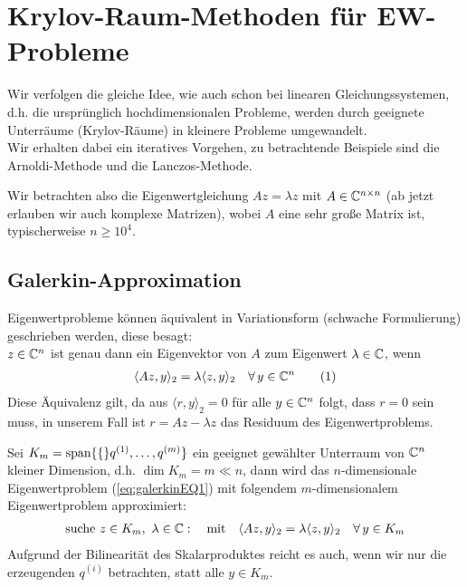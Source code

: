 
\section{Krylov-Raum-Methoden für EW-Probleme}
Wir verfolgen die gleiche Idee, wie auch schon bei linearen Gleichungssystemen, d.h. die ursprünglich hochdimensionalen
Probleme, werden durch geeignete Unterräume (Krylov-Räume) in kleinere Probleme umgewandelt. \\
Wir erhalten dabei ein iteratives Vorgehen, zu betrachtende Beispiele sind die Arnoldi-Methode und die 
Lanczos-Methode.

Wir betrachten also die Eigenwertgleichung $Az=\lambda z$ mit $A\in\mathbb C^{n\times n}$ 
(ab jetzt erlauben wir auch komplexe Matrizen), wobei $A$ eine sehr große
Matrix ist, typischerweise $n\geq 10^4$.

\subsection{Galerkin-Approximation}
Eigenwertprobleme können äquivalent in Variationsform (schwache Formulierung) geschrieben werden, diese besagt: \\
$z\in\mathbb C^n$ ist genau dann ein Eigenvektor von $A$ zum Eigenwert $\lambda\in\mathbb C$, wenn
%
\begin{align*}
  \langle Az,y\rangle_2 
  = \lambda\langle z,y\rangle_2 \quad\forall\,y\in\mathbb C^n 
  \tag{1}\label{eq:galerkinEQ1}
\end{align*}
%
Diese Äquivalenz gilt, da aus $\langle r, y\rangle_2 = 0$ für alle $y\in\mathbb C^{n}$ folgt, dass $r=0$ sein muss, 
in unserem Fall ist $r=Az-\lambda z$ das Residuum des Eigenwertproblems.

Sei $K_m=\text{span}\{\{\}q^{(1)},\dots,q^{(m)}\}$ ein geeignet gewählter Unterraum von $\mathbb C^n$ kleiner Dimension, d.h. 
$\dim K_m=m\ll n$, dann wird das $n$-dimensionale Eigenwertproblem (\ref{eq:galerkinEQ1}) mit 
folgendem $m$-dimensionalem Eigenwertproblem approximiert: 
%
\begin{align*}
  \text{suche } z\in K_m, \ \lambda\in\mathbb C : 
  \quad \text{mit}\quad 
  \langle Az,y\rangle_2 
  = \lambda\langle z,y\rangle_2 
  \quad\forall\,y\in K_m
\end{align*}
%
Aufgrund der Bilinearität des Skalarproduktes reicht es auch, wenn wir nur die erzeugenden $q^{(i)}$ betrachten, 
statt alle $y\in K_m$. 

